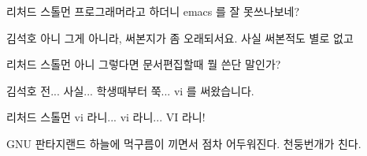 \documentclass{screenplay}
\begin{document}
    \begin{dialogue}{리처드 스톨먼}
        프로그래머라고 하더니 emacs 를 잘 못쓰나보네?
    \end{dialogue}
    \begin{dialogue}{김석호}
        아니 그게 아니라, 써본지가 좀 오래되서요.
        사실 써본적도 별로 없고
    \end{dialogue}
    \begin{dialogue}{리처드 스톨먼}
        아니 그렇다면 문서편집할때 뭘 쓴단 말인가?
    \end{dialogue}
    \begin{dialogue}[난처해하며]{김석호}
        전... 사실... 학생때부터 쭉... vi 를 써왔습니다.
    \end{dialogue}
    \begin{dialogue}[놀라며]{리처드 스톨먼}
        vi 라니... vi 라니...
        VI 라니!
    \end{dialogue}
    
    GNU 판타지랜드 하늘에 먹구름이 끼면서 점차 어두워진다. 천둥번개가 친다.
    
\end{document}
